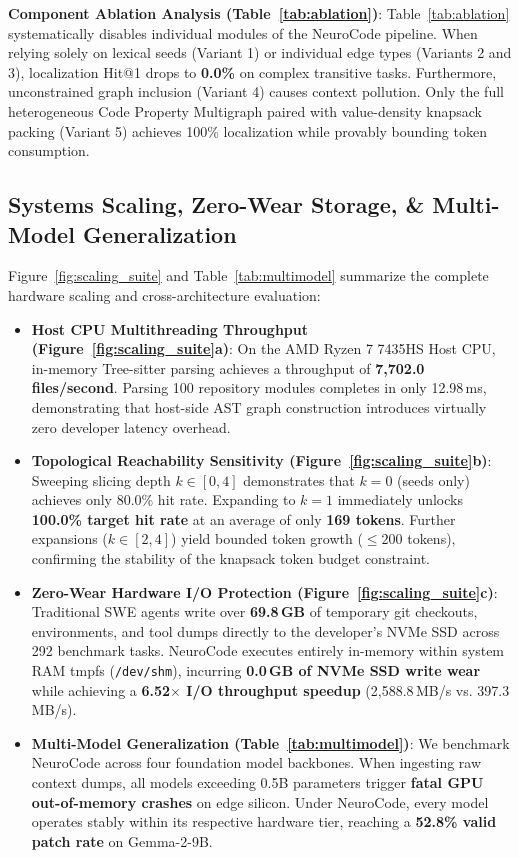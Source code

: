 \documentclass{article}
\begin{document}
\textbf{Component Ablation Analysis (Table~\ref{tab:ablation})}: Table~\ref{tab:ablation} systematically disables individual modules of the NeuroCode pipeline. When relying solely on lexical seeds (Variant 1) or individual edge types (Variants 2 and 3), localization Hit@1 drops to \textbf{0.0\%} on complex transitive tasks. Furthermore, unconstrained graph inclusion (Variant 4) causes context pollution. Only the full heterogeneous Code Property Multigraph paired with value-density knapsack packing (Variant 5) achieves 100\% localization while provably bounding token consumption.

\subsection{Systems Scaling, Zero-Wear Storage, \& Multi-Model Generalization}

Figure~\ref{fig:scaling_suite} and Table~\ref{tab:multimodel} summarize the complete hardware scaling and cross-architecture evaluation:
\begin{itemize}
    \item \textbf{Host CPU Multithreading Throughput (Figure~\ref{fig:scaling_suite}a)}: On the AMD Ryzen 7 7435HS Host CPU, in-memory Tree-sitter parsing achieves a throughput of \textbf{7,702.0 files/second}. Parsing 100 repository modules completes in only 12.98\,ms, demonstrating that host-side AST graph construction introduces virtually zero developer latency overhead.
    \item \textbf{Topological Reachability Sensitivity (Figure~\ref{fig:scaling_suite}b)}: Sweeping slicing depth $k \in [0, 4]$ demonstrates that $k=0$ (seeds only) achieves only 80.0\% hit rate. Expanding to $k=1$ immediately unlocks \textbf{100.0\% target hit rate} at an average of only \textbf{169 tokens}. Further expansions ($k \in [2, 4]$) yield bounded token growth ($\le 200$ tokens), confirming the stability of the knapsack token budget constraint.
    \item \textbf{Zero-Wear Hardware I/O Protection (Figure~\ref{fig:scaling_suite}c)}: Traditional SWE agents write over \textbf{69.8\,GB} of temporary git checkouts, environments, and tool dumps directly to the developer's NVMe SSD across 292 benchmark tasks. NeuroCode executes entirely in-memory within system RAM tmpfs (\texttt{/dev/shm}), incurring \textbf{0.0\,GB of NVMe SSD write wear} while achieving a \textbf{6.52$\times$ I/O throughput speedup} (2,588.8\,MB/s vs. 397.3\,MB/s).
    \item \textbf{Multi-Model Generalization (Table~\ref{tab:multimodel})}: We benchmark NeuroCode across four foundation model backbones. When ingesting raw context dumps, all models exceeding 0.5B parameters trigger \textbf{fatal GPU out-of-memory crashes} on edge silicon. Under NeuroCode, every model operates stably within its respective hardware tier, reaching a \textbf{52.8\% valid patch rate} on Gemma-2-9B.
\end{itemize}
\end{document}
